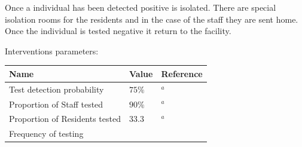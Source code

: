 \documentclass[
]{article}
\begin{document}
Once a individual has been detected positive is isolated. There are
special isolation rooms for the residents and in the case of the staff
they are sent home. Once the individual is tested negative it return to
the facility.

Interventions parameters:

\begin{longtable}[]{@{}lll@{}}
\toprule
\begin{minipage}[b]{0.42\columnwidth}\raggedright
Name\strut
\end{minipage} & \begin{minipage}[b]{0.33\columnwidth}\raggedright
Value\strut
\end{minipage} & \begin{minipage}[b]{0.16\columnwidth}\raggedright
Reference\strut
\end{minipage}\tabularnewline
\midrule
\endhead
\begin{minipage}[t]{0.42\columnwidth}\raggedright
Test detection probability\strut
\end{minipage} & \begin{minipage}[t]{0.33\columnwidth}\raggedright
\(75\%\)\strut
\end{minipage} & \begin{minipage}[t]{0.16\columnwidth}\raggedright
\(^a\)\strut
\end{minipage}\tabularnewline
\begin{minipage}[t]{0.42\columnwidth}\raggedright
Proportion of Staff tested\strut
\end{minipage} & \begin{minipage}[t]{0.33\columnwidth}\raggedright
\(90\%\)\strut
\end{minipage} & \begin{minipage}[t]{0.16\columnwidth}\raggedright
\(^a\)\strut
\end{minipage}\tabularnewline
\begin{minipage}[t]{0.42\columnwidth}\raggedright
Proportion of Residents tested\strut
\end{minipage} & \begin{minipage}[t]{0.33\columnwidth}\raggedright
\(33.3%
\)\strut
\end{minipage} & \begin{minipage}[t]{0.16\columnwidth}\raggedright
\(^a\)\strut
\end{minipage}\tabularnewline
\begin{minipage}[t]{0.42\columnwidth}\raggedright
Frequency of testing\strut
\end{minipage} & \begin{minipage}[t]{0.33\columnwidth}\raggedright

\end{minipage}
\end{longtable}
\end{document}
